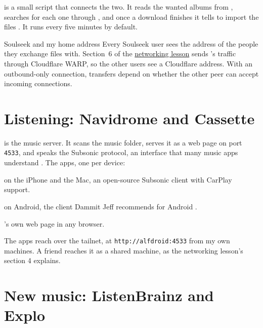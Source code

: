 \documentclass[11pt,a4paper]{article}
\begin{document}
 is a small  script that connects the two. It reads the wanted albums from , searches for each one through , and once a download finishes it tells  to import the files \cite{soularr}. It runs every five minutes by default.

\begin{insight}{Soulseek and my home address}
Every Soulseek user sees the address of the people they exchange files with.
Section~6 of the \href{https://github.com/Atcold/learning-with-claude/tree/master/networking}{networking lesson} sends 's traffic through Cloudflare WARP, so the other users see a Cloudflare address. With an outbound-only connection, transfers depend on whether the other peer can accept incoming connections.
\end{insight}

\section{Listening: Navidrome and Cassette}

 is the music server. It scans the music folder, serves it as a web page on port \texttt{4533}, and speaks the Subsonic protocol, an interface that many music apps understand \cite{navapps}. The apps, one per device:

\begin{compactitemize}
  \item {} on the iPhone and the Mac, an open-source Subsonic client with CarPlay support.
  \item {} on Android, the client Dammit Jeff recommends for Android \cite{jeffquit}.
  \item {}'s own web page in any browser.
\end{compactitemize}

The apps reach  over the tailnet, at \texttt{http://alfdroid:4533} from my own machines. A friend reaches it as a shared machine, as the networking lesson's section 4 explains.

\section{New music: ListenBrainz and Explo}
\end{document}
